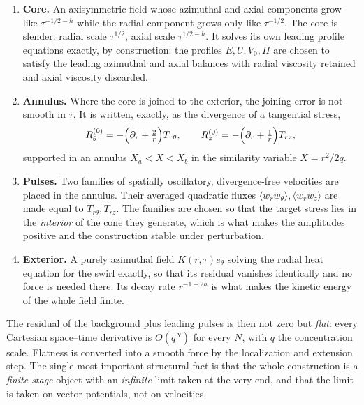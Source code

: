 \begin{enumerate}[label=(\roman*)]
  \item \textbf{Core.} An axisymmetric field whose azimuthal and axial components grow like
        $\tau^{-1/2-h}$ while the radial component grows only like $\tau^{-1/2}$. The core
        is slender: radial scale $\tau^{1/2}$, axial scale $\tau^{1/2-h}$. It solves its
        own leading profile equations exactly, by construction: the profiles $E,U,V_0,\Pi$
        are chosen to satisfy the leading azimuthal and axial balances with radial
        viscosity retained and axial viscosity discarded.
  \item \textbf{Annulus.} Where the core is joined to the exterior, the joining error is
        not smooth in $\tau$. It is written, exactly, as the divergence of a tangential
        stress,
        \[
          R^{(0)}_\theta = -\Bigl(\partial_r+\tfrac2r\Bigr)T_{r\theta},
          \qquad
          R^{(0)}_z = -\Bigl(\partial_r+\tfrac1r\Bigr)T_{rz},
        \]
        supported in an annulus $X_a<X<X_b$ in the similarity variable $X=r^2/2q$.
  \item \textbf{Pulses.} Two families of spatially oscillatory, divergence-free velocities
        are placed in the annulus. Their averaged quadratic fluxes
        $\langle w_r w_\theta\rangle,\langle w_r w_z\rangle$ are made equal to
        $T_{r\theta},T_{rz}$. The families are chosen so that the target stress lies in the
        \emph{interior} of the cone they generate, which is what makes the amplitudes
        positive and the construction stable under perturbation.
  \item \textbf{Exterior.} A purely azimuthal field $K(r,\tau)e_\theta$ solving the radial
        heat equation for the swirl exactly, so that its residual vanishes identically and
        no force is needed there. Its decay rate $r^{-1-2h}$ is what makes the kinetic
        energy of the whole field finite.
\end{enumerate}

The residual of the background plus leading pulses is then not zero but \emph{flat}: every
Cartesian space--time derivative is $O(q^N)$ for every $N$, with $q$ the concentration
scale. Flatness is converted into a smooth force by the localization and extension step.
The single most important structural fact is that the whole construction is a
\emph{finite-stage} object with an \emph{infinite} limit taken at the very end, and that
the limit is taken on vector potentials, not on velocities.

